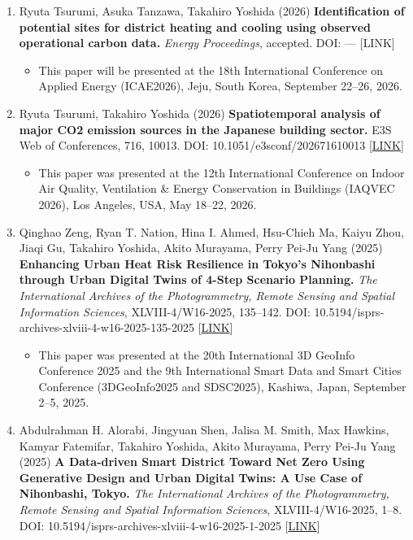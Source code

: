 \documentclass[
]{book}
\providecommand{\tightlist}{%
  \setlength{\itemsep}{0pt}\setlength{\parskip}{0pt}}
\begin{document}
\begin{enumerate}
\def\labelenumi{\arabic{enumi}.}
\tightlist
\item
  Ryuta Tsurumi, Asuka Tanzawa, Takahiro Yoshida (2026)
  \textbf{Identification of potential sites for district heating and cooling using observed operational carbon data.}
  \emph{Energy Proceedings}, accepted.
  DOI: --- {[}LINK{]}

  \begin{itemize}
  \tightlist
  \item
    This paper will be presented at the 18th International Conference on Applied Energy (ICAE2026), Jeju, South Korea, September 22--26, 2026.
  \end{itemize}
\item
  Ryuta Tsurumi, Takahiro Yoshida (2026)
  \textbf{Spatiotemporal analysis of major CO2 emission sources in the Japanese building sector.}
  E3S Web of Conferences, 716, 10013.
  DOI: 10.1051/e3sconf/202671610013 {[}\href{https://doi.org/10.1051/e3sconf/202671610013}{LINK}{]}

  \begin{itemize}
  \tightlist
  \item
    This paper was presented at the 12th International Conference on Indoor Air Quality, Ventilation \& Energy Conservation in Buildings (IAQVEC 2026), Los Angeles, USA, May 18--22, 2026.
  \end{itemize}
\item
  Qinghao Zeng, Ryan T. Nation, Hina I. Ahmed, Hsu-Chieh Ma, Kaiyu Zhou, Jiaqi Gu, Takahiro Yoshida, Akito Murayama, Perry Pei-Ju Yang (2025)
  \textbf{Enhancing Urban Heat Risk Resilience in Tokyo's Nihonbashi through Urban Digital Twins of 4-Step Scenario Planning.}
  \emph{The International Archives of the Photogrammetry, Remote Sensing and Spatial Information Sciences}, XLVIII-4/W16-2025, 135--142.
  DOI: 10.5194/isprs-archives-xlviii-4-w16-2025-135-2025 {[}\href{https://isprs-archives.copernicus.org/articles/XLVIII-4-W16-2025/135/2025/}{LINK}{]}

  \begin{itemize}
  \tightlist
  \item
    This paper was presented at the 20th International 3D GeoInfo Conference 2025 and the 9th International Smart Data and Smart Cities Conference (3DGeoInfo2025 and SDSC2025), Kashiwa, Japan, September 2--5, 2025.
  \end{itemize}
\item
  Abdulrahman H. Alorabi, Jingyuan Shen, Jalisa M. Smith, Max Hawkins, Kamyar Fatemifar, Takahiro Yoshida, Akito Murayama, Perry Pei-Ju Yang (2025)
  \textbf{A Data-driven Smart District Toward Net Zero Using Generative Design and Urban Digital Twins: A Use Case of Nihonbashi, Tokyo.}
  \emph{The International Archives of the Photogrammetry, Remote Sensing and Spatial Information Sciences}, XLVIII-4/W16-2025, 1--8.
  DOI: 10.5194/isprs-archives-xlviii-4-w16-2025-1-2025 {[}\href{https://isprs-archives.copernicus.org/articles/XLVIII-4-W16-2025/1/2025/}{LINK}{]}


\end{enumerate}
\end{document}
